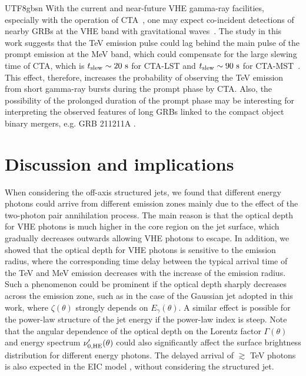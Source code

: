 \documentclass[fleqn,usenatbib]{mnras}
\begin{document}
\begin{CJK*}{UTF8}{gbsn}
With the current and near-future VHE gamma-ray facilities, especially with the operation of CTA~\citep{CTAConsortium:2017dvg}, one may expect co-incident detections of nearby GRBs at the VHE band with gravitational waves~\citep[e.g.,][]{murase+2018,Bartos:2019tsp}.
The study in this work suggests that the TeV emission pulse could lag behind the main pulse of the prompt emission at the MeV band, which could compensate for the large slewing time of CTA, which is $t_{\rm slew} \sim 20\rm~s$ for CTA-LST and $t_{\rm slew} \sim 90\rm~s$ for CTA-MST~\citep{banerjee22}. This effect, therefore, increases the probability of observing the TeV emission from short gamma-ray bursts during the prompt phase by CTA. Also, the possibility of the prolonged duration of the prompt phase may be interesting for interpreting the observed features of long GRBs linked to the compact object binary mergers, e.g. GRB 211211A \citep{troja22, jun22, mei22, rastinejad22}.


\section{Discussion and implications} \label{sec:dis}
When considering the off-axis structured jets, we found that different energy photons could arrive from different emission zones mainly due to the effect of the two-photon pair annihilation process. 
The main reason is that the optical depth for VHE photons is much higher in the core region on the jet surface, which gradually decreases outwards allowing VHE photons to escape.
In addition, we showed that the optical depth for VHE photons is sensitive to the emission radius, where the corresponding time delay between the typical arrival time of the TeV and MeV emission decreases with the increase of the emission radius.
Such a phenomenon could be prominent if the optical depth sharply decreases across the emission zone, such as in the case of the Gaussian jet adopted in this work, where $\zeta (\theta)$ strongly depends on $E_\gamma(\theta)$.
A similar effect is possible for the power-law structure of the jet energy if the power-law index is steep. 
Note that the angular dependence of the optical depth on the Lorentz factor $\Gamma(\theta)$ and energy spectrum $\nu_{0,\rm HE}^\prime(\theta)$ could also significantly affect the surface brightness distribution for different energy photons. The delayed arrival of $\gtrsim$ TeV photons is also expected in the EIC model \citep[e.g.,][]{murase+2010,Kimura19,zhang23}, without considering the structured jet.


\end{CJK*}
\end{document}
